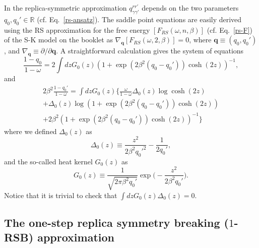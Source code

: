 \documentclass[twocolumn,superscriptaddress,prb,10pt]{revtex4-1}
\begin{document}
In the replica-symmetric approximation $q_{\gamma\gamma'}^{rr'}$ depends on the two 
parameters $q_0,q_0'\in\mathbb{R}$ (cf. Eq.~\eqref{rs-ansatz}). The saddle point 
equations are easily derived using the RS approximation for the free energy $[F_{RS}
(\omega,n,\beta)]$ (cf. Eq.~\eqref{rs-F}) of the S-K model on the booklet as 
$\nabla_{\mathbf{q}}[F_{RS}(\omega,2,\beta)]=0$, where $\mathbf{q}\equiv(q_0,q_0')$, 
and $\nabla_{\mathbf{q}}\equiv\partial/\partial\mathbf{q}$. A straightforward 
calculation gives the system of equations  
%
\begin{equation}
\label{RS-saddle-1}
\frac{1-q_0}{1-\omega}=2\int dz G_0(z)(1+\exp(2\beta^2(q_0-q_0'))\cosh(2z))^{-1},
\end{equation}
%
and
%
\begin{multline}
\label{RS-saddle-2}
2\beta^2\frac{1-q_0'}{1-\omega}=
\int dz G_0(z)\Big\{\frac{\omega}{1-\omega}\Delta_0(z)
\log\cosh(2z)\\
+\Delta_0(z)\log(1+\exp(2\beta^2(q_0-q_0'))\cosh(2z))\\
+2\beta^2(1+\exp(2\beta^2(q_0-q_0'))\cosh(2z))^{-1}
\Big\}
\end{multline}
%
where we defined $\Delta_0(z)$ as 
%
\begin{equation}
\Delta_0(z)\equiv\frac{z^2}{2\beta^2q_0'^2}-\frac{1}{2q_0'},
\end{equation}
%
and the so-called heat kernel $G_0(z)$ as 
%
\begin{equation}
G_0(z)\equiv\frac{1}{\sqrt{2\pi \beta^2 q_0'}}\exp\Big(-\frac{z^2}
{2\beta^2 q_0'}\Big).
\end{equation}
%
Notice that it is trivial to check that $\int dz G_0(z)\Delta_0(z)=0$.

\subsection{The one-step replica symmetry breaking ($1$-RSB) approximation}
\end{document}
